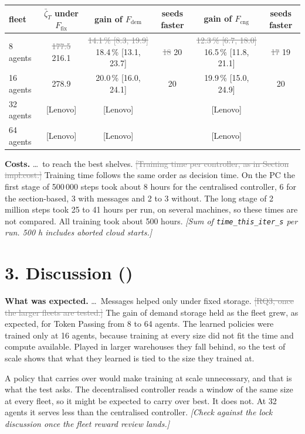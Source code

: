 \documentclass[11pt,a4paper]{article}
\newcommand{\new}[1]{\textcolor{newc}{#1}}
\newcommand{\old}[1]{\textcolor{gray}{\sout{#1}}}
\newcommand{\note}[1]{{\small\itshape [#1]}}
\newcommand{\lab}[1]{\textsf{\footnotesize\detokenize{#1}}}
\begin{document}
\begin{tabular}{l c cc cc}
  \toprule
  fleet & $\bar\zeta_T$ under $F_{\mathrm{fix}}$ & gain of $F_{\mathrm{dem}}$ & seeds faster
    & gain of $F_{\mathrm{cng}}$ & seeds faster \\
  \midrule
  8 agents  & \old{177.5} \new{216.1} & \old{14.1\,\% [8.3, 19.9]} \new{18.4\,\% [13.1, 23.7]} & \old{18} \new{20} & \old{12.3\,\% [6.7, 18.0]} \new{16.5\,\% [11.8, 21.1]} & \old{17} \new{19} \\
  16 agents & 278.9 & 20.0\,\% [16.0, 24.1] & 20 & 19.9\,\% [15.0, 24.9] & 20 \\
  32 agents & \new{[Lenovo]} & \new{[Lenovo]} & & \new{[Lenovo]} & \\
  64 agents & \new{[Lenovo]} & \new{[Lenovo]} & & \new{[Lenovo]} & \\
  \bottomrule
\end{tabular}

\textbf{Costs.} \ldots\ to reach the best shelves.
\old{[Training time per controller, as in Section impl:cost.]}
\new{Training time follows the same order as decision time. On the PC the
first stage of 500\,000 steps took about 8 hours for the centralised
controller, 6 for the section-based, 3 with messages and 2 to 3 without. The
long stage of 2 million steps took 25 to 41 hours per run, on several
machines, so these times are not compared. All training took about 500
hours.}
\note{Sum of \texttt{time\_this\_iter\_s} per run. 500 h includes aborted
cloud starts.}

\section*{3. Discussion (\lab{sec:exp:discussion})}

\textbf{What was expected.} \ldots\ Messages helped only under fixed storage.
\old{[RQ3, once the larger fleets are tested.]}
\new{The gain of demand storage held as the fleet grew, as expected, for
Token Passing from 8 to 64 agents. The learned policies were trained only at
16 agents, because training at every size did not fit the time and compute
available. Played in larger warehouses they fall behind, so the test of scale
shows that what they learned is tied to the size they trained at.}

\new{A policy that carries over would make training at scale unnecessary,
and that is what the test asks. The decentralised controller reads a window
of the same size at every fleet, so it might be expected to carry over best.
It does not. At 32 agents it serves less than the centralised controller.}
\note{Check against the lock discussion once the fleet reward review lands.}
\end{document}
